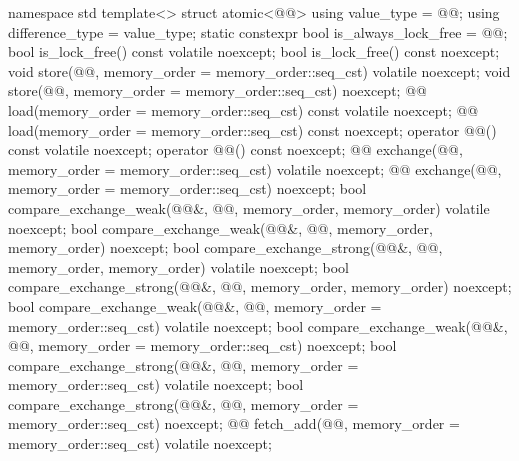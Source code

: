 \begin{codeblock}
namespace std {
  template<> struct atomic<@@> {
    using value_type = @@;
    using difference_type = value_type;
    static constexpr bool is_always_lock_free = @@;
    bool is_lock_free() const volatile noexcept;
    bool is_lock_free() const noexcept;
    void store(@@, memory_order = memory_order::seq_cst) volatile noexcept;
    void store(@@, memory_order = memory_order::seq_cst) noexcept;
    @@ load(memory_order = memory_order::seq_cst) const volatile noexcept;
    @@ load(memory_order = memory_order::seq_cst) const noexcept;
    operator @@() const volatile noexcept;
    operator @@() const noexcept;
    @@ exchange(@@, memory_order = memory_order::seq_cst) volatile noexcept;
    @@ exchange(@@, memory_order = memory_order::seq_cst) noexcept;
    bool compare_exchange_weak(@@&, @@,
                               memory_order, memory_order) volatile noexcept;
    bool compare_exchange_weak(@@&, @@,
                               memory_order, memory_order) noexcept;
    bool compare_exchange_strong(@@&, @@,
                                 memory_order, memory_order) volatile noexcept;
    bool compare_exchange_strong(@@&, @@,
                                 memory_order, memory_order) noexcept;
    bool compare_exchange_weak(@@&, @@,
                               memory_order = memory_order::seq_cst) volatile noexcept;
    bool compare_exchange_weak(@@&, @@,
                               memory_order = memory_order::seq_cst) noexcept;
    bool compare_exchange_strong(@@&, @@,
                                 memory_order = memory_order::seq_cst) volatile noexcept;
    bool compare_exchange_strong(@@&, @@,
                                 memory_order = memory_order::seq_cst) noexcept;
    @@ fetch_add(@@, memory_order = memory_order::seq_cst) volatile noexcept;
}}
\end{codeblock}
